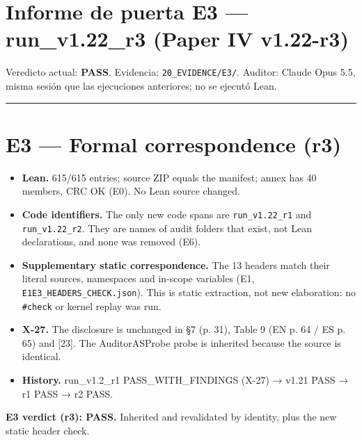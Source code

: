 \documentclass[
]{article}
\author{}
\date{}
\providecommand{\tightlist}{%
  \setlength{\itemsep}{0pt}\setlength{\parskip}{0pt}}
\begin{document}
\section{Informe de puerta E3 --- run\_v1.22\_r3 (Paper IV
v1.22-r3)}\label{informe-de-puerta-e3--run_v122_r3-paper-iv-v122-r3}

Veredicto actual: \textbf{PASS}. Evidencia: \texttt{20\_EVIDENCE/E3/}.
Auditor: Claude Opus 5.5, misma sesión que las ejecuciones anteriores;
no se ejecutó Lean.

\begin{center}\rule{0.5\linewidth}{0.5pt}\end{center}

\section{E3 --- Formal correspondence
(r3)}\label{e3--formal-correspondence-r3}

\begin{itemize}
\tightlist
\item
  \textbf{Lean.} 615/615 entries; source ZIP equals the manifest; annex
  has 40 members, CRC OK (E0). No Lean source changed.
\item
  \textbf{Code identifiers.} The only new code spans are
  \texttt{run\_v1.22\_r1} and \texttt{run\_v1.22\_r2}. They are names of
  audit folders that exist, not Lean declarations, and none was removed
  (E6).
\item
  \textbf{Supplementary static correspondence.} The 13 headers match
  their literal sources, namespaces and in-scope variables (E1,
  \texttt{E1E3\_HEADERS\_CHECK.json}). This is static extraction, not
  new elaboration: no \texttt{\#check} or kernel replay was run.
\item
  \textbf{X-27.} The disclosure is unchanged in §7 (p. 31), Table 9 (EN
  p. 64 / ES p. 65) and {[}23{]}. The AuditorASProbe probe is inherited
  because the source is identical.
\item
  \textbf{History.} run\_v1.2\_r1 PASS\_WITH\_FINDINGS (X-27) → v1.21
  PASS → r1 PASS → r2 PASS.
\end{itemize}

\textbf{E3 verdict (r3): PASS.} Inherited and revalidated by identity,
plus the new static header check.
\end{document}
